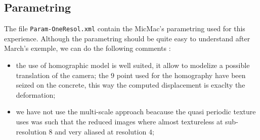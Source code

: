 \subsection{Parametring}


The file {\tt Param-OneResol.xml} contain the MicMac's parametring used for this experience.
Although the parametring should be quite easy to understand after March's exemple, we can
do the following comments :

\begin{itemize}
    \item  the use of homographic model is well suited, it allow to modelize a possible translation
          of the camera; the $9$ point used for the homography have been seized on the concrete, this
          way the computed displacement is exaclty the deformation;

    \item  we have not use the multi-scale approach beacause the quasi periodic texture uses was
           such that the reduced images where almost textureless at sub-resolution $8$ and very
           aliased at resolution $4$;
\end{itemize}





